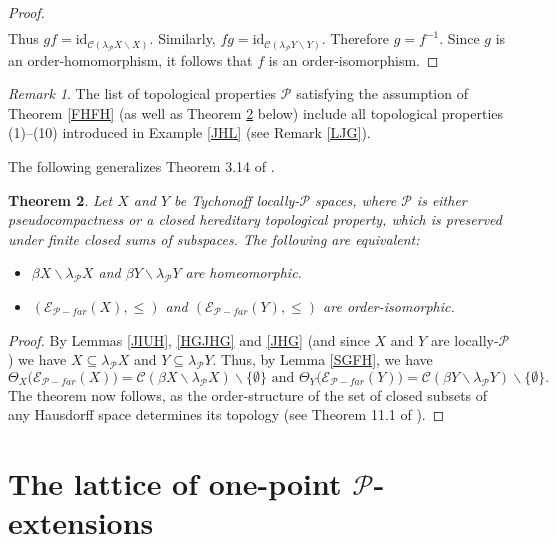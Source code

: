 \documentclass{amsart}
\newtheorem{theorem}{Theorem}[section]
\theoremstyle{definition}
\theoremstyle{remark}
\newtheorem{remark}[theorem]{Remark}
\theoremstyle{notation}
\numberwithin{equation}{section}
\begin{document}
\begin{proof}
\begin{eqnarray*}
\end{eqnarray*}
Thus $gf=\mbox{id}_{{\mathscr C}(\lambda_{{\mathcal P}} X\backslash X)}$. Similarly,  $fg=\mbox{id}_{{\mathscr C}(\lambda_{{\mathcal P}} Y\backslash Y)}$.
Therefore $g=f^{-1}$. Since $g$  is an  order-homomorphism, it follows that $f$ is an  order-isomorphism.
\end{proof}

\begin{remark}\label{KHGD}
The list of topological properties ${\mathcal P}$ satisfying the assumption of Theorem \ref{FHFH} (as well as Theorem \ref{FJHFH} below) include
all topological properties (1)--(10) introduced in Example \ref{JHL} (see Remark \ref{LJG}).
\end{remark}

The following  generalizes Theorem 3.14 of  \cite{Ko2}.

\begin{theorem}\label{FJHFH}
Let $X$ and $Y$ be Tychonoff locally-${\mathcal P}$ spaces,  where  ${\mathcal P}$ is either pseudocompactness or a closed hereditary topological
property, which is preserved under  finite closed sums of subspaces. The following are equivalent:
\begin{itemize}
\item[\rm(1)] $\beta X\backslash\lambda_{{\mathcal P}} X$ and $\beta Y\backslash\lambda_{{\mathcal P}} Y$ are homeomorphic.
\item[\rm(2)] $({\mathscr E}_{{\mathcal P}-far}(X),\leq)$ and $({\mathscr E}_{{\mathcal P}-far}(Y),\leq)$ are order-isomorphic.
\end{itemize}
\end{theorem}

\begin{proof}
By Lemmas \ref{JIUH}, \ref{HGJHG} and \ref{JHG} (and since $X$ and $Y$ are locally-${\mathcal P}$) we have $X\subseteq\lambda_{{\mathcal P}} X$ and $Y\subseteq\lambda_{{\mathcal P}} Y$. Thus, by Lemma \ref{SGFH}, we have
\[\Theta_X\big({\mathscr E}_{{\mathcal P-far}}(X)\big)={\mathscr C}(\beta X\backslash\lambda_{{\mathcal P}} X)\backslash\{\emptyset\}\mbox{ and }\Theta_Y\big({\mathscr E}_{{\mathcal P-far}}(Y)\big)={\mathscr C}(\beta Y\backslash\lambda_{{\mathcal P}} Y)\backslash\{\emptyset\}.\]
The theorem now follows, as the order-structure of the set of closed subsets of any Hausdorff space determines its topology
(see Theorem 11.1 of \cite{B}).
\end{proof}

\section{The lattice of one-point ${\mathcal P}$-extensions}
\end{document}

